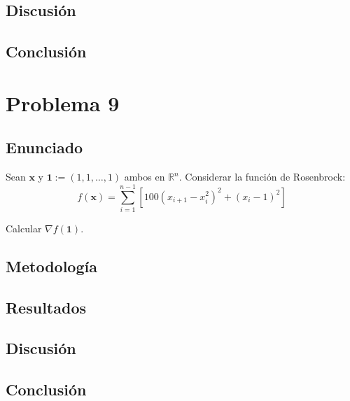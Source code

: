 \documentclass{article}
\begin{document}
\subsection{Discusión}

\subsection{Conclusión}

\section{Problema 9}

\subsection{Enunciado}
Sean $\mathbf{x}$ y $\mathbf{1} := (1, 1, \ldots, 1)$ ambos en $\mathbb{R}^n$. Considerar la función de Rosenbrock:
$$f(\mathbf{x}) = \sum_{i=1}^{n-1} \left[100(x_{i+1} - x_i^2)^2 + (x_i - 1)^2\right]$$

Calcular $\nabla f(\mathbf{1})$.

\subsection{Metodología}

\subsection{Resultados}
\setcounter{equation}{0}

\subsection{Discusión}

\subsection{Conclusión}
\end{document}
